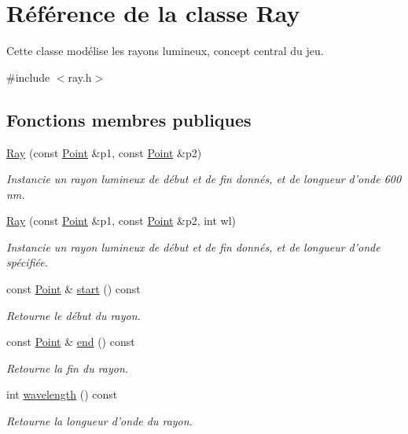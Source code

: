 \hypertarget{classRay}{\section{Référence de la classe Ray}
\label{classRay}
}


Cette classe modélise les rayons lumineux, concept central du jeu.  




{\ttfamily \#include $<$ray.\+h$>$}

\subsection*{Fonctions membres publiques}
\begin{DoxyCompactItemize}
\item 
\hyperlink{classRay_ad9f65a706bdb1ab9a85d2d4d5bcc90ae}{Ray} (const \hyperlink{classPoint}{Point} \&p1, const \hyperlink{classPoint}{Point} \&p2)
\begin{DoxyCompactList}\small\item\em Instancie un rayon lumineux de début et de fin donnés, et de longueur d'onde 600 nm. \end{DoxyCompactList}\item 
\hyperlink{classRay_ad9524414a8c37bbc36a245d7296d847e}{Ray} (const \hyperlink{classPoint}{Point} \&p1, const \hyperlink{classPoint}{Point} \&p2, int wl)
\begin{DoxyCompactList}\small\item\em Instancie un rayon lumineux de début et de fin donnés, et de longueur d'onde spécifiée. \end{DoxyCompactList}\item 
const \hyperlink{classPoint}{Point} \& \hyperlink{classRay_afb483cd8f050771fa653e01b811d9a2a}{start} () const 
\begin{DoxyCompactList}\small\item\em Retourne le début du rayon. \end{DoxyCompactList}\item 
const \hyperlink{classPoint}{Point} \& \hyperlink{classRay_a5667cdc0b8ea0e636c482342b86a2355}{end} () const 
\begin{DoxyCompactList}\small\item\em Retourne la fin du rayon. \end{DoxyCompactList}\item 
int \hyperlink{classRay_a8aa2934015c635d89ac51ac2195ae019}{wavelength} () const 
\begin{DoxyCompactList}\small\item\em Retourne la longueur d'onde du rayon. \end{DoxyCompactList}\item 

\end{DoxyCompactItemize}
